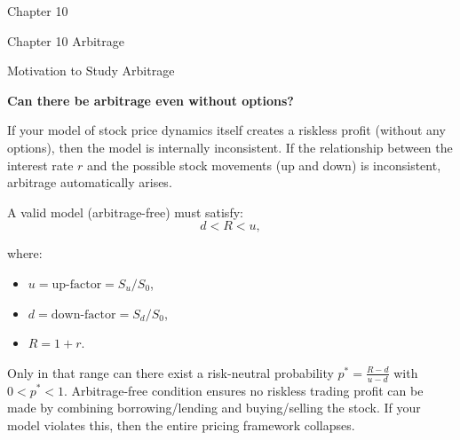 \documentclass{beamer}
\begin{document}
\begin{frame}{Chapter 10}

    {
    \begin{center}
        Chapter 10 Arbitrage
    \end{center}
 
    }
    
\end{frame}
\begin{frame}{Motivation to Study Arbitrage}

    {\footnotesize \footnotesize
    \textbf{Can there be arbitrage even without options?}
    \vspace{1em}
    \par If your model of stock price dynamics itself creates a riskless profit (without any options), 
    then the model is internally inconsistent.  If the relationship between the interest rate \( r \)
    and the possible stock movements (up and down) is inconsistent, arbitrage automatically arises.
    \vspace{1em}
    \par A valid model (arbitrage-free) must satisfy:
    \[
    d < R < u,
    \]

     \pause where:
    \begin{itemize}
    \item \( u = \text{up-factor} = S_u / S_0 \),
    \item \( d = \text{down-factor} = S_d / S_0 \),
    \item \( R = 1 + r \).
    \end{itemize}

    Only in that range can there exist a risk-neutral probability \( p^* = \frac{R-d}{u-d} \) with \( 0 < p^* < 1 \).
    Arbitrage-free condition ensures no riskless trading profit 
    can be made by combining borrowing/lending and buying/selling the stock.
    If your model violates this, then the entire pricing framework collapses.

    }
\end{frame}
\end{document}
